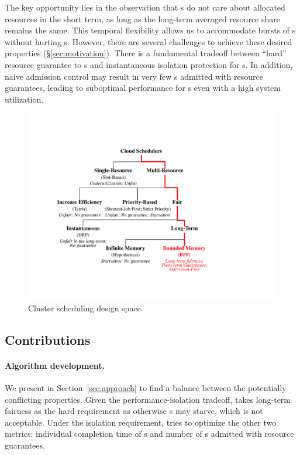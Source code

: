 The key opportunity lies in the observation that {\batchq}s do not care about allocated resources in the short term, as long as the long-term averaged resource share remains the same. 
This temporal flexibility allows us to accommodate bursts of {\burstq}s without hurting {\batchq}s. 
However, there are several challenges to achieve these desired properties (\S\ref{sec:motivation}). There is a fundamental tradeoff between ``hard'' resource guarantee to {\burstq}s and instantaneous isolation protection for {\batchq}s. 
In addition, naive admission control may result in very few {\burstq}s admitted with resource guarantees, leading to suboptimal performance for {\burstq}s even with a high system utilization. %

\begin{figure}[!t]
  \centering
  \includegraphics[width=\columnwidth]{fig/Design-Space.pdf}%
  \caption{Cluster scheduling design space.}%
  \label{fig:design-space}
\end{figure}

\subsection*{Contributions}

\paragraph{Algorithm development.}
We present {\name} in Section~\ref{sec:approach} to find a balance between the potentially conflicting properties. 
Given the performance-isolation tradeoff, {\name} takes long-term fairness as the hard requirement as otherwise {\batchq}s may starve, which is not acceptable. 
Under the isolation requirement, {\name} tries to optimize the other two metrics: individual completion time of {\burstq}s and number of {\burstq}s admitted with resource guarantees. 

